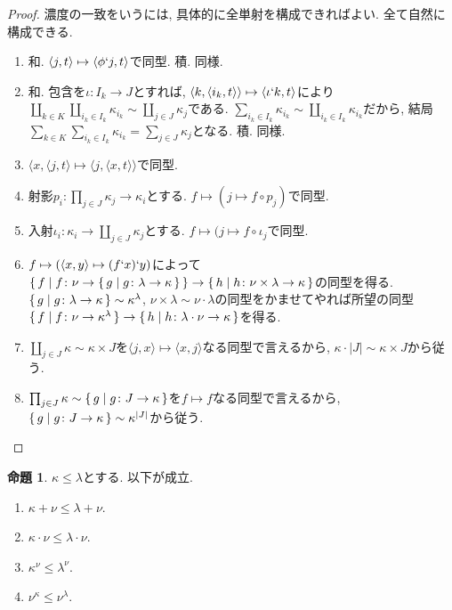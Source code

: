 \documentclass[a4paper, twoside]{bxjsarticle}
\newcommand{\abs}[1]{\left\lvert#1\right\rvert}
\theoremstyle{definition}
\newtheorem{prop}[thm]{命題}
\begin{document}
        \begin{proof}
            濃度の一致をいうには, 具体的に全単射を構成できればよい. 全て自然に構成できる.
            \begin{enumerate}
                \item 和. $\langle j, t\rangle \mapsto \langle \phi`j, t\rangle$で同型. 積. 同様.
                \item 和. 包含を$\iota\colon I_k\to J$とすれば, $\langle k, \langle i_k, t\rangle \rangle\mapsto \langle \iota`k, t \rangle$により$\coprod_{k\in K}\coprod_{i_k\in I_k}\kappa_{i_k} \sim \coprod_{j\in J}\kappa_j$である. $\sum_{i_k\in I_k}\kappa_{i_k}\sim\coprod_{i_k\in I_k}\kappa_{i_k}$だから, 結局$\sum_{k\in K}\sum_{i_k\in I_k}\kappa_{i_k} = \sum_{j\in J}\kappa_j$となる. 積. 同様.
                \item $\langle x, \langle j, t\rangle \mapsto \langle j, \langle x, t\rangle \rangle$で同型.
                \item 射影$p_i\colon \prod_{j\in J}\kappa_j\to \kappa_i$とする. $f \mapsto (j\mapsto f\circ p_j)$で同型.
                \item 入射$\iota_i\colon \kappa_i\to\coprod_{j\in J}\kappa_j$とする. $f \mapsto (j\mapsto f\circ\iota_j$で同型.
                \item $f \mapsto (\langle x, y\rangle \mapsto (f`x)`y)$によって$\set{f|f\colon \nu\to \set{g|g\colon \lambda\to\kappa}}\to \set{h|h\colon \nu\times\lambda\to\kappa}$の同型を得る. $\set{g|g\colon \lambda\to\kappa}\sim\kappa^\lambda$, $\nu\times\lambda\sim\nu\cdot\lambda$の同型をかませてやれば所望の同型$\set{f|f\colon \nu\to\kappa^\lambda}\to\set{h|h\colon\lambda\cdot\nu\to\kappa}$を得る.
                \item $\coprod_{j\in J}\kappa\sim\kappa\times J$を$\langle j, x\rangle \mapsto \langle x, j\rangle$なる同型で言えるから, $\kappa\cdot\abs{J}\sim \kappa\times J$から従う.
                \item $\prod_{j\in J}\kappa\sim \set{g|g\colon J\to\kappa}$を$f \mapsto f$なる同型で言えるから, $\set{g|g\colon J\to\kappa}\sim \kappa^{\abs{J}}$から従う.
            \end{enumerate}
        \end{proof}
        \begin{prop}
            $\kappa\leq\lambda$とする. 以下が成立.
            \begin{enumerate}
                \item $\kappa+\nu\leq\lambda+\nu$.
                \item $\kappa\cdot\nu\leq\lambda\cdot\nu$.
                \item $\kappa^\nu\leq\lambda^\nu$.
                \item $\nu^\kappa\leq\nu^\lambda$.
            \end{enumerate}
        \end{prop}
\end{document}
